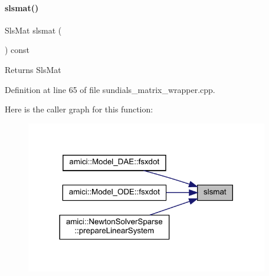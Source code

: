 \paragraph{\texorpdfstring{slsmat()}{slsmat()}}
{\footnotesize\ttfamily Sls\+Mat slsmat (\begin{DoxyParamCaption}{ }\end{DoxyParamCaption}) const}

\begin{DoxyReturn}{Returns}
Sls\+Mat 
\end{DoxyReturn}


Definition at line 65 of file sundials\+\_\+matrix\+\_\+wrapper.\+cpp.

Here is the caller graph for this function\+:
\nopagebreak
\begin{figure}[H]
\begin{center}
\leavevmode
\includegraphics[width=300pt]{classamici_1_1_sls_mat_wrapper_ae1d2d562c699946445244cca406c4994_icgraph}
\end{center}
\end{figure}
